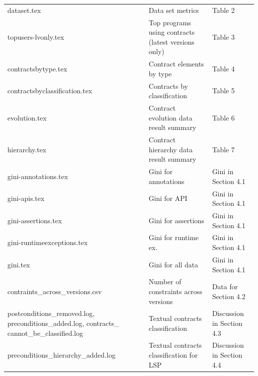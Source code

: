 \documentclass[a4paper,UKenglish]{darts}
\begin{document}
\begin{scope}
\begin{table}[t]
\begin{tabular}{p{5cm} p{4cm} p{4cm} }
  		dataset.tex & Data set metrics & Table 2 \\
  		topusers-lvonly.tex & Top programs using contracts (latest versions only) & Table 3 \\
  		contractsbytype.tex & Contract elements by type & Table 4  \\
  		contractsbyclassification.tex & Contracts by classification & Table 5 \\
  		evolution.tex & Contract evolution data result summary & Table 6 \\
  		hierarchy.tex & Contract hierarchy data result summary & Table 7 \\
  		
  		gini-annotations.tex & Gini for annotations & Gini in Section 4.1 \\
  		gini-apis.tex & Gini for API & Gini in Section 4.1 \\
  		gini-assertions.tex & Gini for assertions & Gini in Section 4.1 \\
  		gini-runtimeexceptions.tex & Gini for runtime ex. & Gini in Section 4.1 \\
  		gini.tex & Gini for all data & Gini in Section 4.1 \\
  		contraints\_across\_versions.csv & Number of constraints across versions & Data for Section 4.2\\
  		postconditions\_removed.log, preconditions\_added.log, contracts\_ cannot\_be\_classified.log & Textual contracts classification & Discussion in Section 4.3 \\
  		preconditions\_hierarchy\_added.log & Textual contracts classification for LSP & Discussion in Section 4.4 \\
  		\hline
  	\end{tabular}
  \end{table}



\end{scope}
\end{document}
